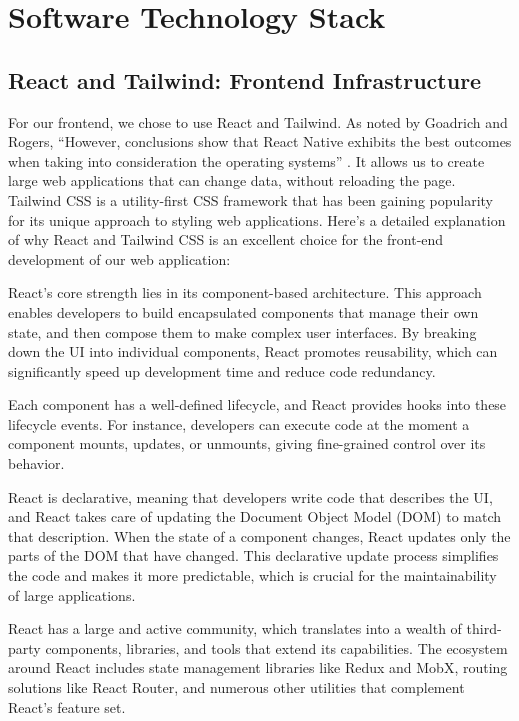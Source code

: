 \section{Software Technology Stack}
\label{sec:technology}

\subsection{React and Tailwind: Frontend Infrastructure}
For our frontend, we chose to use React and Tailwind. As noted by Goadrich and Rogers, ``However, conclusions show that React Native exhibits the best outcomes when taking into consideration the operating systems'' \cite[p.~611]{goadrich2011smart}. It allows us to create large web applications that can change data, without reloading the page.
Tailwind CSS is a utility-first CSS framework that has been gaining popularity for its unique approach to styling web applications. 
Here's a detailed explanation of why React and Tailwind CSS is an excellent choice for the front-end development of our web application:

React's core strength lies in its component-based architecture. This approach enables developers to build encapsulated components that manage their own state, and then compose them to make complex user interfaces. 
By breaking down the UI into individual components, React promotes reusability, which can significantly speed up development time and reduce code redundancy.

Each component has a well-defined lifecycle, and React provides hooks into these lifecycle events. 
For instance, developers can execute code at the moment a component mounts, updates, or unmounts, giving fine-grained control over its behavior.

React is declarative, meaning that developers write code that describes the UI, and React takes care of updating the Document Object Model (DOM) to match that description. 
When the state of a component changes, React updates only the parts of the DOM that have changed. 
This declarative update process simplifies the code and makes it more predictable, which is crucial for the maintainability of large applications.

React has a large and active community, which translates into a wealth of third-party components, libraries, and tools that extend its capabilities. 
The ecosystem around React includes state management libraries like Redux and MobX, routing solutions like React Router, and numerous other utilities that complement React's feature set.


